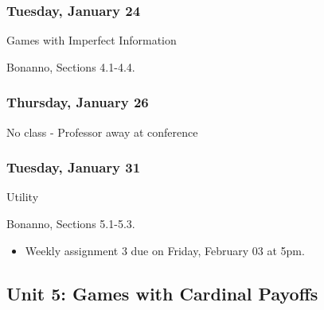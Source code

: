 \documentclass[
]{article}
\providecommand{\tightlist}{%
  \setlength{\itemsep}{0pt}\setlength{\parskip}{0pt}}
\begin{document}
\begin{multicols}{2}

\hypertarget{tuesday-january-24}{%
\subsubsection{Tuesday, January 24}\label{tuesday-january-24}}

\begin{description}
\tightlist
\item[Topic]
Games with Imperfect Information
\item[Reading]
Bonanno, Sections 4.1-4.4.
\end{description}

\hypertarget{thursday-january-26}{%
\subsubsection{Thursday, January 26}\label{thursday-january-26}}

No class - Professor away at conference

\end{multicols}

\hypertarget{tuesday-january-31}{%
\subsubsection{Tuesday, January 31}\label{tuesday-january-31}}

\begin{description}
\tightlist
\item[Topic]
Utility
\item[Reading]
Bonanno, Sections 5.1-5.3.
\end{description}

\begin{itemize}
\tightlist
\item
  Weekly assignment 3 due on Friday, February 03 at 5pm.
\end{itemize}

\hypertarget{unit-5-games-with-cardinal-payoffs}{%
\subsection{Unit 5: Games with Cardinal
Payoffs}\label{unit-5-games-with-cardinal-payoffs}}
\end{document}
